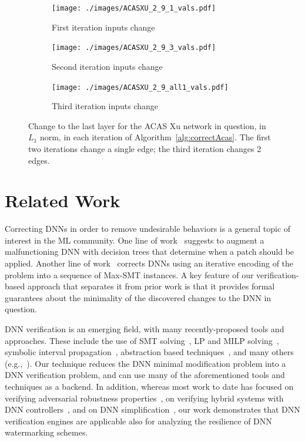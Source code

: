 \documentclass{easychair}
\begin{document}
\begin{figure}
\centering
\begin{subfigure}{0.2\linewidth}
  \texttt{[image: ./images/ACASXU\_2\_9\_1\_vals.pdf]}
  \caption{First iteration inputs change}
\end{subfigure}
\begin{subfigure}{0.2\linewidth}
  \texttt{[image: ./images/ACASXU\_2\_9\_3\_vals.pdf]}
  \caption{Second iteration inputs change}
\end{subfigure}
\begin{subfigure}{0.2\linewidth}
  \texttt{[image: ./images/ACASXU\_2\_9\_all1\_vals.pdf]}
  \caption{Third iteration inputs change}
\end{subfigure}
\caption{Change to the last layer for the ACAS Xu network in question,
  in $L_1$ norm,
  in each iteration of Algorithm~\ref{alg:correctAcas}. The first two
  iterations change a single edge; the third iteration changes 2 edges.}
\label{fig:lastLayerACASXU}
\end{figure}


\section{Related Work}
\label{sec:relatedWork}

Correcting DNNs in order to remove undesirable behaviors is a general
topic of interest in the ML community. One line of
work~\cite{KaLe18,KaFu18} suggests to augment a malfunctioning DNN
with decision trees that determine when a patch should be
applied. Another line of work~\cite{SoTh19} corrects DNNs using an
iterative encoding of the problem into a sequence of Max-SMT
instances. A key feature of our verification-based approach that
separates it from prior work is that it provides formal
guarantees about the minimality of the discovered changes to the DNN
in question.

DNN verification is an emerging field, with many recently-proposed
tools and approaches. These include the use of SMT
solving~\cite{HuKwWaWu17,JaBaKa20,KaBaDiJuKo17Reluplex,KaHuIbJuLaLiShThWuZeDiKoBa19Marabou},
LP and MILP solving~\cite{Ehlers2017,TjXiTe19}, symbolic interval
propagation~\cite{WaPeWhYaJa18}, abstraction based
techniques~\cite{ElGoKa20,GeMiDrTsChVe18}, and many others
(e.g.,~\cite{BuTuToKoMu18,DuJhSaTi18,KaBaKaSc19,KuKaGoJuBaKo18,LoMa17,NaKaRySaWa17,RuHuKw18,SiGePuVe19}).
Our technique reduces the DNN minimal modification problem into a DNN
verification problem, and can use many of the aforementioned tools and
techniques as a backend. In addition, whereas most work to date has
focused on verifying adversarial robustness
properties~\cite{BaIoLaVyNoCr16,CaKaBaDi17,GoKaPaBa18,KaBaDiJuKo17Fvav},
on verifying hybrid systems with DNN
controllers~\cite{DuChSa19,SuKhSh19}, and on DNN
simplification~\cite{GoFeMaBaKa20}, our work demonstrates that DNN
verification engines are applicable also for analyzing the resilience
of DNN watermarking schemes.
\end{document}
